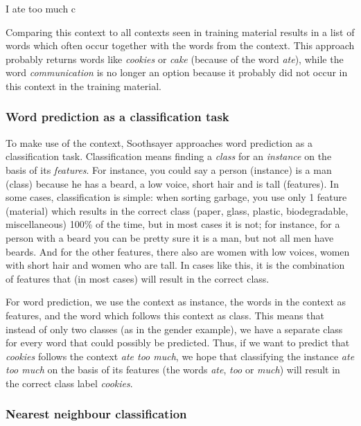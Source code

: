 \documentclass[12pt]{article}
\begin{document}
\begin{examples}
\item I ate too much c \label{only_c_r}
\end{examples}

Comparing this context to all contexts seen in training material results in a list of words which often occur together with the words from the context. This approach probably returns words like \emph{cookies} or \emph{cake} (because of the word \emph{ate}), while the word \emph{communication} is no longer an option because it probably did not occur in this context in the training material.

\subsubsection{Word prediction as a classification task}

To make use of the context, Soothsayer approaches word prediction as a classification task. Classification means finding a \emph{class} for an \emph{instance} on the basis of its \emph{features}. For instance, you could say a person (instance) is a man (class) because he has a beard, a low voice, short hair and is tall (features). In some cases, classification is simple: when sorting garbage, you use only 1 feature (material) which results in the correct class (paper, glass, plastic, biodegradable, miscellaneous) 100\% of the time, but in most cases it is not; for instance, for a person with a beard you can be pretty sure it is a man, but not all men have beards. And for the other features, there also are women with low voices, women with short hair and women who are tall. In cases like this, it is the combination of features that (in most cases) will result in the correct class.

For word prediction, we use the context as instance, the words in the context as features, and the word which follows this context as class. This means that instead of only two classes (as in the gender example), we have a separate class for every word that could possibly be predicted. Thus, if we want to predict that \emph{cookies} follows the context \emph{ate too much}, we hope that classifying the instance \emph{ate too much} on the basis of its features (the words \emph{ate}, \emph{too} or \emph{much}) will result in the correct class label \emph{cookies}.

\subsubsection{Nearest neighbour classification}
\end{document}
